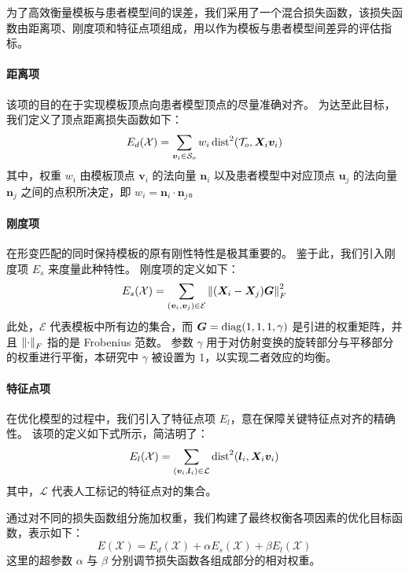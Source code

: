 为了高效衡量模板与患者模型间的误差，我们采用了一个混合损失函数，该损失函数由距离项、刚度项和特征点项组成，用以作为模板与患者模型间差异的评估指标。

\paragraph{距离项}
该项的目的在于实现模板顶点向患者模型顶点的尽量准确对齐。
为达至此目标，我们定义了顶点距离损失函数如下：
\begin{equation}
  E_d(\mathcal{X}) = \sum_{\bm{v}_i \in \mathcal{S}_o} w_i \operatorname{dist}^2(\mathcal{T}_o, \bm{X}_i \bm{v}_i)
\end{equation}
其中，权重 $w_i$ 由模板顶点 $\bm{v}_i$ 的法向量 $\bm{n}_i$ 以及患者模型中对应顶点 $\bm{u}_j$ 的法向量 $\bm{n}_j$ 之间的点积所决定，即 $w_i = \bm{n}_i \cdot \bm{n}_j$。

\paragraph{刚度项}
在形变匹配的同时保持模板的原有刚性特性是极其重要的。
鉴于此，我们引入刚度项 $E_s$ 来度量此种特性。
刚度项的定义如下：
\begin{equation}
  E_s(\mathcal{X}) = \sum_{(\bm{v}_i, \bm{v}_j) \in \mathcal{E}} \norm{(\bm{X}_i - \bm{X}_j) \bm{G}}_F^2
\end{equation}
此处，$\mathcal{E}$ 代表模板中所有边的集合，而 $\bm{G} = \operatorname{diag}(1, 1, 1, \gamma)$ 是引进的权重矩阵，并且 $\norm{\cdot}_F$ 指的是 Frobenius 范数。
参数 $\gamma$ 用于对仿射变换的旋转部分与平移部分的权重进行平衡，本研究中 $\gamma$ 被设置为 1，以实现二者效应的均衡。

\paragraph{特征点项}
在优化模型的过程中，我们引入了特征点项 $E_l$，意在保障关键特征点对齐的精确性。
该项的定义如下式所示，简洁明了：
\begin{equation}
  E_l(\mathcal{X}) = \sum_{(\bm{v}_i, \bm{l}_i) \in \mathcal{L}} \operatorname{dist}^2(\bm{l}_i, \bm{X}_i \bm{v}_i)
\end{equation}
其中，$\mathcal{L}$ 代表人工标记的特征点对的集合。

通过对不同的损失函数组分施加权重，我们构建了最终权衡各项因素的优化目标函数，表示如下：
\begin{equation}
  E(\mathcal{X}) = E_d(\mathcal{X}) + \alpha E_s(\mathcal{X}) + \beta E_l(\mathcal{X})
\end{equation}
这里的超参数 $\alpha$ 与 $\beta$ 分别调节损失函数各组成部分的相对权重。

